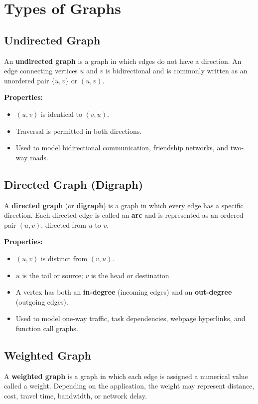 \section{Types of Graphs}

\subsection{Undirected Graph}
An \textbf{undirected graph} is a graph in which edges do not have a direction. An edge connecting vertices $u$ and $v$ is bidirectional and is commonly written as an unordered pair $\{u, v\}$ or $(u, v)$.

\textbf{Properties:}
\begin{itemize}
    \item $(u, v)$ is identical to $(v, u)$.
    \item Traversal is permitted in both directions.
    \item Used to model bidirectional communication, friendship networks, and two-way roads.
\end{itemize}

\subsection{Directed Graph (Digraph)}
A \textbf{directed graph} (or \textbf{digraph}) is a graph in which every edge has a specific direction. Each directed edge is called an \textbf{arc} and is represented as an ordered pair $(u, v)$, directed from $u$ to $v$.

\textbf{Properties:}
\begin{itemize}
    \item $(u, v)$ is distinct from $(v, u)$.
    \item $u$ is the tail or source; $v$ is the head or destination.
    \item A vertex has both an \textbf{in-degree} (incoming edges) and an \textbf{out-degree} (outgoing edges).
    \item Used to model one-way traffic, task dependencies, webpage hyperlinks, and function call graphs.
\end{itemize}

\subsection{Weighted Graph}
A \textbf{weighted graph} is a graph in which each edge is assigned a numerical value called a weight. Depending on the application, the weight may represent distance, cost, travel time, bandwidth, or network delay.

